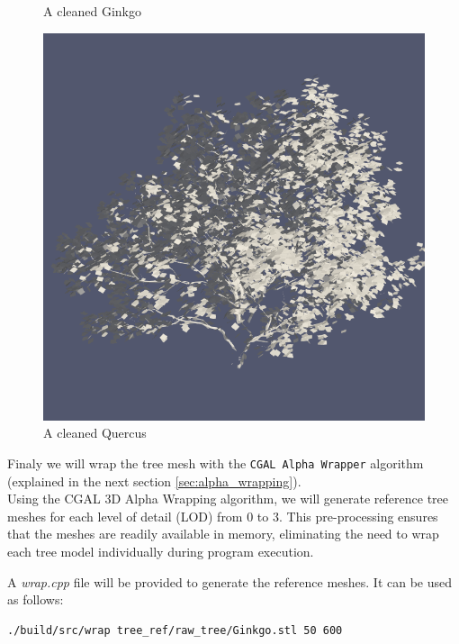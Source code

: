 \documentclass[12pt]{article}
\begin{document}
\begin{figure}[H]
\begin{minipage}{0.30\textwidth}
        \caption{A cleaned Ginkgo}
    \end{minipage}
    \begin{minipage}{0.30\textwidth}
        \centering
        \includegraphics[width=1\textwidth]{images/tree-quercus.png}
        \caption{A cleaned Quercus}
    \end{minipage}
\end{figure}


Finaly we will wrap the tree mesh with the
\texttt{CGAL Alpha Wrapper}\cite{cgal_alpha_wrapper} algorithm (explained in the 
next section \autoref{sec:alpha_wrapping}). \\


Using the CGAL 3D Alpha Wrapping algorithm, we will generate reference tree
meshes for each level of detail (LOD) from 0 to 3. This pre-processing ensures
that the meshes are readily available in memory, eliminating the need to wrap
each tree model individually during program execution.

A \textit{wrap.cpp} file will be provided to generate the reference meshes.
It can be used as follows:

\begin{lstlisting}[language=bash]
./build/src/wrap tree_ref/raw_tree/Ginkgo.stl 50 600
\end{lstlisting}
\end{document}
